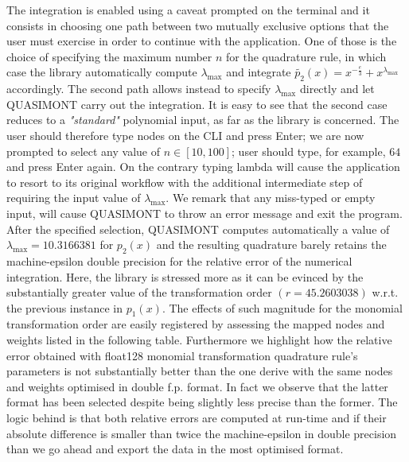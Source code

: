 \documentclass[a4paper, twosided]{book}
\begin{document}
\noindent
The integration is enabled using a caveat prompted on the terminal and it consists in choosing one path between two mutually exclusive options that the user must exercise in order to continue with the application. One of those is the choice of specifying the maximum number $n$ for the quadrature rule, in which case the library  automatically compute $\lambda_{\text{max}}$ and integrate $\tilde{p_2}(x) = x^{-\frac{e}{3}} + x^{\lambda_\text{max}}$ accordingly. The second path allows instead to specify $\lambda_{\text{max}}$ directly and let QUASIMONT carry out the integration. It is easy to see that the second case reduces to a \textsl{"standard"} polynomial input, as far as the library is concerned. The user should therefore type \colorbox{poliGrayBlue}{nodes} on the CLI and press Enter; we are now prompted to select any value of $n\in[10,100]$; user should type, for example, $64$ and press Enter again. On the contrary typing \colorbox{poliGrayBlue}{lambda} will cause the application to resort to its original workflow with the additional intermediate step of requiring the input value of $\lambda_{\text{max}}$. We remark that any miss-typed or empty input, will cause QUASIMONT to throw an error message and exit the program. After the specified selection, QUASIMONT computes automatically a value of $\lambda_{\text{max}} = 10.3166381$ for $p_2(x)$ and the resulting quadrature barely retains the machine-epsilon double precision for the relative error of the numerical integration. Here, the library is stressed more as it can be evinced by the substantially greater value of the transformation order $(r=45.2603038)$ w.r.t. the previous instance in $p_1(x)$. The effects of such magnitude for the monomial transformation order are easily registered by assessing the mapped nodes and weights listed in the following table. Furthermore we highlight how the relative error obtained with \colorbox{poliGrayBlue}{float128} monomial transformation quadrature rule's parameters is not substantially better than the one derive with the same nodes and weights optimised in double f.p. format. In fact we observe that the latter format has been selected despite being slightly less precise than the former. The logic behind is that both relative errors are computed at run-time and if their absolute difference is smaller than twice the machine-epsilon in double precision than we go ahead and export the data in the most optimised format.
\end{document}
